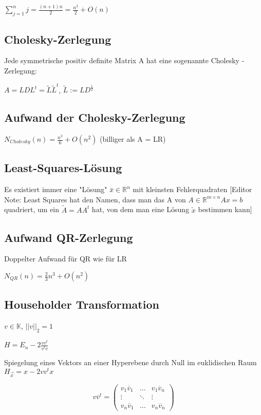 \documentclass[12pt,a4paper]{article} %
\newcommand*\conj[1]{\overline{#1}}
\newcommand*\tab[1][1cm]{\hspace*{#1}}
\begin{document}
	$\sum\limits_{j = 1}^nj = \frac{(n + 1)n}{2} = \frac{n^2}{2} + O(n)$
	
	\subsection{Cholesky-Zerlegung}
	
	Jede symmetrische positiv definite Matrix A hat eine sogenannte Cholesky - Zerlegung:
	
	$A = LDL^t = \tilde{L}\tilde{L}^t$, $\tilde{L} := LD^{\frac{1}{2}}$
	
	\subsection{Aufwand der Cholesky-Zerlegung}
	
	$N_{Cholesky}(n) = \frac{n^3}{6} + O(n^2)$ \tab (billiger als A = LR)
	
	\subsection{Least-Squares-Lösung}
	
	Es existiert immer eine "Lösung" $\bar{x} \in \mathbb{R}^n$ mit kleinsten Fehlerquadraten
	[Editor Note: Least Squares hat den Namen, dass man das A von $A \in \mathbb{R}^{m \times n} Ax = b$ quadriert, um ein $\tilde{A} = AA^t$ hat, von dem man eine Lösung $\tilde{x}$ bestimmen kann]
	
	\subsection{Aufwand QR-Zerlegung}
	
	Doppelter Aufwand für QR wie für LR
	
	$N_{QR}(n) = \frac{2}{3}n^3 + O(n^2)$
	
	\subsection{Householder Transformation}
	
	$v \in \mathbb{K}$, $||v||_2 = 1$
	
	$H = E_n - 2 \frac{vv^t}{v^tv}$
	
	Spiegelung eines Vektors an einer Hyperebene durch Null im euklidischen Raum $H_{\overrightarrow{x}} = x - 2vv^tx$
	
	\begin{equation*}
		v\conj{v}^t =
		\begin{pmatrix}
			v_1\conj{v}_1 & \dotsc & v_1\conj{v}_n \\
			\vdots & \ddots & \vdots \\
			v_n\conj{v}_1 & \dotsc & v_n\conj{v}_n
		\end{pmatrix}
	\end{equation*}
	
\end{document}
